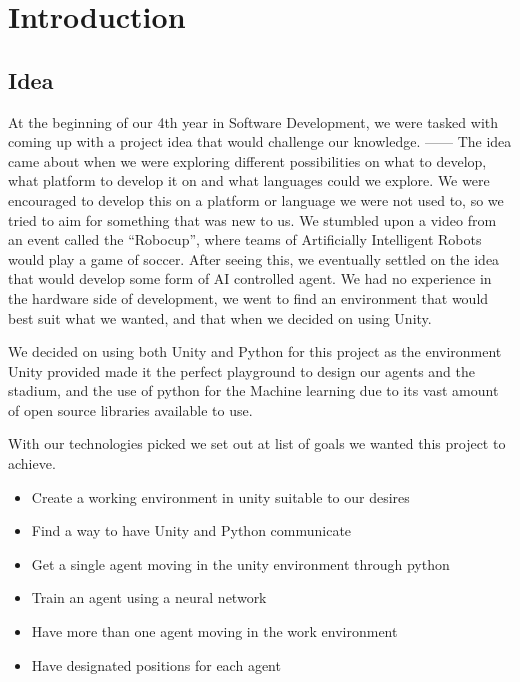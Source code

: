 
\chapter{Introduction}


\section{Idea}
At the beginning of our 4th year in Software Development, we were tasked with coming up with a project idea that would challenge our knowledge. ------
The idea came about when we were exploring different possibilities on what to develop, what platform to develop it on and what languages could we explore. We were encouraged to develop this on a platform or language we were not used to, so we tried to aim for something that was new to us. We stumbled upon a video from an event called the “Robocup”, where teams of Artificially Intelligent Robots would play a game of soccer. After seeing this, we eventually settled on the idea that would develop some form of AI controlled agent. We had no experience in the hardware side of development, we went to find an environment that would best suit what we wanted, and that when we decided on using Unity.


We decided on using both Unity and Python for this project as the environment Unity provided made it the perfect playground to design our agents and the stadium, and the use of python for the Machine learning due to its vast amount of open source libraries available to use.

With our technologies picked we set out at list of goals we wanted this project to achieve. 
\begin{itemize}
  \item Create a working environment in unity suitable to our desires
  \item Find a way to have Unity and Python communicate
  \item Get a single agent moving in the unity environment through python
  \item Train an agent using a neural network
  \item Have more than one agent moving in the work environment
  \item Have designated positions for each agent
\end{itemize}

